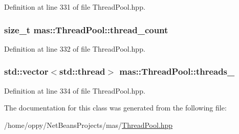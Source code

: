 Definition at line 331 of file Thread\-Pool.\-hpp.

\hypertarget{classmas_1_1_thread_pool_a5cd471f0c5c9457b42d76d0b84bea21e}{
\subsubsection[{thread\-\_\-count}]{\setlength{\rightskip}{0pt plus 5cm}size\-\_\-t mas\-::\-Thread\-Pool\-::thread\-\_\-count\hspace{0.3cm}{\ttfamily [protected]}}}\label{classmas_1_1_thread_pool_a5cd471f0c5c9457b42d76d0b84bea21e}


Definition at line 332 of file Thread\-Pool.\-hpp.

\hypertarget{classmas_1_1_thread_pool_ae3f3ad42c9e80519e504f7d8f11f6be1}{
\subsubsection[{threads\-\_\-}]{\setlength{\rightskip}{0pt plus 5cm}std\-::vector$<$std\-::thread$>$ mas\-::\-Thread\-Pool\-::threads\-\_\-\hspace{0.3cm}{\ttfamily [protected]}}}\label{classmas_1_1_thread_pool_ae3f3ad42c9e80519e504f7d8f11f6be1}


Definition at line 334 of file Thread\-Pool.\-hpp.



The documentation for this class was generated from the following file\-:\begin{DoxyCompactItemize}
\item 
/home/oppy/\-Net\-Beans\-Projects/mas/\hyperlink{_thread_pool_8hpp}{Thread\-Pool.\-hpp}\end{DoxyCompactItemize}
